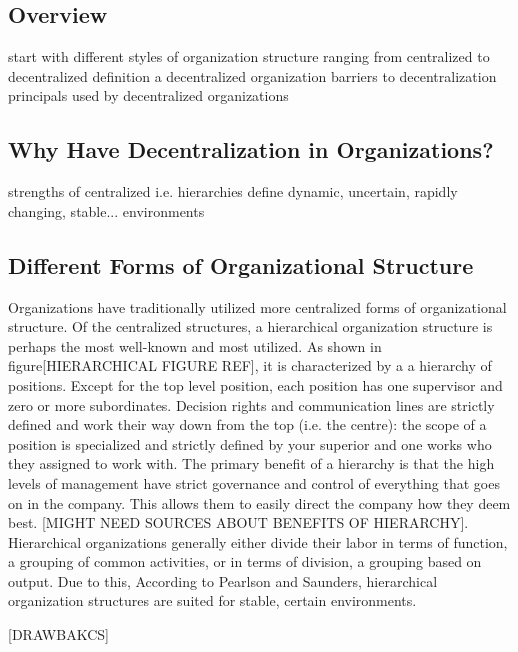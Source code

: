 \subsection{Overview}
start with different styles of organization structure ranging from centralized to decentralized
definition a decentralized organization
barriers to decentralization
principals used by decentralized organizations


\subsection{Why Have Decentralization in Organizations?}
strengths of centralized i.e. hierarchies
define dynamic, uncertain, rapidly changing, stable... environments

\subsection{Different Forms of Organizational Structure}
\label{org:form}

Organizations have traditionally utilized more centralized forms of organizational structure. Of the centralized structures, a hierarchical organization structure is perhaps the most well-known and most utilized. As shown in figure[HIERARCHICAL FIGURE REF], it is characterized by a a hierarchy of positions. Except for the top level position, each position has one supervisor and zero or more subordinates. Decision rights and communication lines are strictly defined and work their way down from the top (i.e. the centre): the scope of a position is specialized and strictly defined by your superior and one works who they assigned to work with. The primary benefit of a hierarchy is that the high levels of management have strict governance and control of everything that goes on in the company. This allows them to easily direct the company how they deem best. [MIGHT NEED SOURCES ABOUT BENEFITS OF HIERARCHY]. Hierarchical organizations generally either divide their labor in terms of function, a grouping of common activities, or in terms of division, a grouping based on output. Due to this, According to Pearlson and Saunders, hierarchical organization structures are suited for stable, certain environments. ~\cite{pearlson2009}

[DRAWBAKCS]

